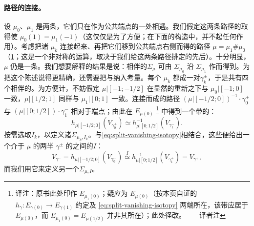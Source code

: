 \paragraph{路径的连接。}\label{sub:concatenation-paths}
设 $\mu_0$、$\mu_1$ 是两条\trMatchingPath，它们只在作为公共端点的一处相遇。我们假定这两条路径的\trOrientation{}取得使 $\mu_0(1)=\mu_1(-1)$（这仅仅是为了方便；在下面的构造中，\trOrientation{}并不起任何作用）。考虑把诸 $\mu_k$ 连接起来、再把它们移到公共端点右侧而得的路径 $\mu=\mu_1\#\mu_0$（\cref{fig:path-concatenation}；这是一个非对称的运算，取决于我们给这两条路径排定的先后）。十分明显，$\mu$ 仍是一条\trMatchingPath。我们想要解释的结果是说：相伴的\trMatchingCycle{}$\Sigma_\mu$ 可由 $\Sigma_{\mu_0}$ 沿 $\Sigma_{\mu_1}$ 作\trDehnTwist{}而得到。为把这个陈述说得更精确，还需要把\trFrame{}与\trIsotopy{}纳入考量。每个 $\mu_k$ 都\trSplitting{}成一对\trVanishingPath{}$\gamma_k^\pm$，于是共有四个相伴的\trVanishingCycle。为方便计，不妨假定 $\mu|[-1;-1/2]$ 在显然的重新\trParametrization{}之下与 $\mu_0|[-1;0]$ 一致，$\mu|[1/2;1]$ 同样与 $\mu_1|[0;1]$ 一致。连接而成的路径 $(\mu|[-1/2;0])^{-1}\cdot\gamma_0^+$ 与 $(\mu|[0;1/2])\cdot\gamma_1^-$ 相对于端点\trHomotopic；由此在 $E_{\mu(0)}$%
\footnote{译注：原书此处印作 $E_{\mu_1(0)}$；疑应为 $E_{\mu(0)}$（按本页自证的 $h_\gamma\colon E_{\gamma(0)}\to E_{\gamma(1)}$ 约定及 \eqref{eq:split-vanishing-isotopy} 两端所在\trFiber{}，该带\trFrame{}\trIsotopy{}应居于 $E_{\mu(0)}$，而 $E_{\mu_1(0)}=E_{\mu(1/2)}$ 并非其所在\trFiber{}）；此处径改。——译者注}
中得到一个带\trFrame{}的\trIsotopy：
\begin{equation}\label{eq:split-vanishing-isotopy}
h_{\mu|[-1/2;0]}(V_{\gamma_0^+})\simeq h_{\mu|[0;1/2]}^{-1}(V_{\gamma_1^-}).
\end{equation}
按需选取\trIsotopy{}$I_k$，以定义诸\trMatchingCycle{}$\Sigma_{\mu_k,I_k}$。与\eqref{eq:split-vanishing-isotopy}相结合，这些便给出一个介于 $\mu$ 的两半 $\gamma^\pm$ 的\trVanishingCycle{}之间的\trIsotopy{}$I$：
\begin{equation*}
V_{\gamma^-}=h_{\mu|[-1/2;0]}(V_{\gamma_0^-})\overset{I}{\simeq}h_{\mu|[0;1/2]}^{-1}(V_{\gamma_1^+})=V_{\gamma^+},
\end{equation*}
而我们用它来定义另一个\trMatchingCycle{}$\Sigma_{\mu,I}$。
\begin{figure}[htbp]
\centering
{}
\caption{}\label{fig:path-concatenation}
\end{figure}
